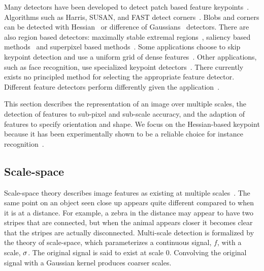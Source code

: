     Many detectors have been developed to detect patch based feature keypoints~\cite{mikolajczyk_comparison_2005,
    tuytelaars_local_2007}. Algorithms such as Harris, SUSAN, and FAST detect corners~\cite{harris_combined_1988,
    mikolajczyk_indexing_2001, smith_susannew_1997, rosten_machine_2006}. Blobs and corners can be detected with
    Hessian~\cite{beaudet_rotationally_1978, lindeberg_shape_adapted_1994} or difference of
    Gaussians~\cite{gaussier_neural_1992, lowe_distinctive_2004} detectors. There are also region based detectors:
    maximally stable extremal regions~\cite{matas_robust_2004}, saliency based
    methods~\cite{buoncompagni_saliency_based_2015} and superpixel based methods~\cite{ren_learning_2003,
    mori_recovering_2004}. Some applications choose to skip keypoint detection and use a uniform grid of dense
    features~\cite{liu_sift_2008, revaud_deep_2015, iscen_comparison_2015}. Other applications, such as face
    recognition, use specialized keypoint detectors~\cite{dantone_real_time_2012, berg_tom_vs_pete_2012}. There
    currently exists no principled method for selecting the appropriate feature detector. Different feature
    detectors perform differently given the application~\cite{tuytelaars_local_2007}.

    This section describes the representation of an image over multiple scales, the detection of features to
    sub-pixel and sub-scale accuracy, and the adaption of features to specify orientation and shape. We focus on
    the Hessian-based keypoint because it has been experimentally shown to be a reliable choice for instance
    recognition~\cite{tuytelaars_local_2007}.

   \subsection{Scale-space}
        Scale-space theory describes image features as existing at multiple
        scales~\cite{lindeberg_scale_space_1993}. The same point on an object seen close up appears quite different
        compared to when it is at a distance. For example, a zebra in the distance may appear to have two stripes
        that are connected, but when the animal appears closer it becomes clear that the stripes are actually
        disconnected.
        Multi-scale detection is formalized by the theory of scale-space, which parameterizes a continuous signal,
        $f$, with a scale, $\sigma$. The original signal is said to exist at scale $0$. Convolving the original
        signal with a Gaussian kernel produces coarser scales.

